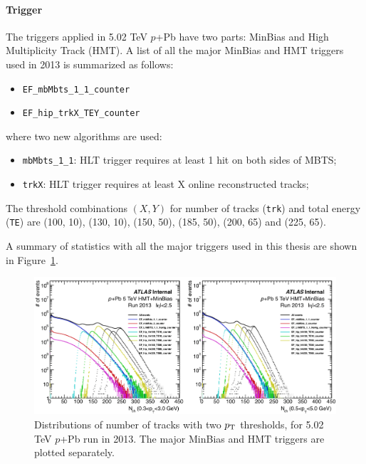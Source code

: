 \paragraph{Trigger}

The triggers applied in 5.02 TeV $p$+Pb have two parts: MinBias and High Multiplicity Track (HMT). A list of all the major MinBias and HMT triggers used in 2013 is summarized as follows:
\begin{itemize}
\item \verb|EF_mbMbts_1_1_counter|
\item \verb|EF_hip_trkX_TEY_counter|
\end{itemize}
where two new algorithms are used:
\begin{itemize}
\item \verb|mbMbts_1_1|: HLT trigger requires at least 1 hit on both sides of MBTS;
\item \verb|trkX|: HLT trigger requires at least X online reconstructed tracks;
\end{itemize}
The threshold combinations $(X, Y)$ for number of tracks (\verb|trk|) and total energy (\verb|TE|) are (100, 10), (130, 10), (150, 50), (185, 50), (200, 65) and (225, 65).

A summary of statistics with all the major triggers used in this thesis are shown in Figure~\ref{fig:detector_ATLAS_trigger_pPb2013}.
\begin{figure}[H]
\centering
\includegraphics[width=.95\linewidth]{figs/chapter_detector/ATLAS_trigger_pPb2013.png}
\caption{Distributions of number of tracks with two $p_\text{T}$ thresholds, for 5.02 TeV $p$+Pb run in 2013. The major MinBias and HMT triggers are plotted separately.}
\label{fig:detector_ATLAS_trigger_pPb2013}
\end{figure}

